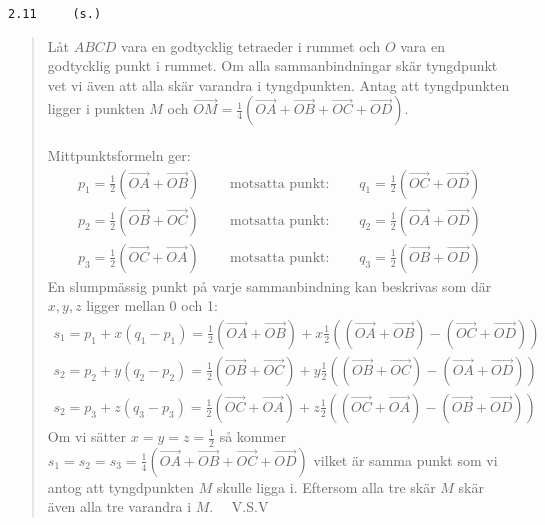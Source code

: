 \documentclass[a4paper]{article}
\newcommand{\tskcol}[1]{\textcolor{tskcol}{#1}}
\newcommand{\vek}[1]{\overrightarrow{#1}}
\begin{document}
\pagebreak
\texttt{\tskcol{2.11~~~~ (s.)}}
\begin{quotation}
	\noindent
	Låt $ABCD$ vara en godtycklig tetraeder i rummet och $O$ vara en godtycklig punkt i rummet. 
	Om alla sammanbindningar skär tyngdpunkt vet vi även att alla skär varandra i tyngdpunkten.
	Antag att tyngdpunkten ligger i punkten $M$ och $\vek{OM}=\frac{1}{4}(\vek{OA}+\vek{OB}+\vek{OC}+\vek{OD})$.
	\\ \\
	Mittpunktsformeln ger:
	\[\begin{array}{lcr}
	p_1=\frac{1}{2}(\vek{OA}+\vek{OB}) & \text{~~~~motsatta punkt:~~~~} & q_1=\frac{1}{2}(\vek{OC}+\vek{OD}) \\
	p_2=\frac{1}{2}(\vek{OB}+\vek{OC}) & \text{~~~~motsatta punkt:~~~~} & q_2=\frac{1}{2}(\vek{OA}+\vek{OD}) \\
	p_3=\frac{1}{2}(\vek{OC}+\vek{OA}) & \text{~~~~motsatta punkt:~~~~} & q_3=\frac{1}{2}(\vek{OB}+\vek{OD})
	\end{array}\]
	En slumpmässig punkt på varje sammanbindning kan beskrivas som där $x,y,z$ ligger mellan 0 och 1:
	\[\begin{array}{l}
	s_1=p_1+x(q_1-p_1)=\frac{1}{2}(\vek{OA}+\vek{OB})+x\frac{1}{2}((\vek{OA}+\vek{OB})-(\vek{OC}+\vek{OD})) \\
	s_2=p_2+y(q_2-p_2)=\frac{1}{2}(\vek{OB}+\vek{OC})+y\frac{1}{2}((\vek{OB}+\vek{OC})-(\vek{OA}+\vek{OD})) \\
	s_2=p_3+z(q_3-p_3)=\frac{1}{2}(\vek{OC}+\vek{OA})+z\frac{1}{2}((\vek{OC}+\vek{OA})-(\vek{OB}+\vek{OD}))
	\end{array}\]
	Om vi sätter $x=y=z=\frac{1}{2}$ så kommer $s_1=s_2=s_3=\frac{1}{4}(\vek{OA}+\vek{OB}+\vek{OC}+\vek{OD})$ vilket är samma punkt som vi antog att tyngdpunkten $M$ skulle ligga i. Eftersom alla tre skär $M$ skär även alla tre varandra i $M$. ~~V.S.V
\end{quotation}
\end{document}
